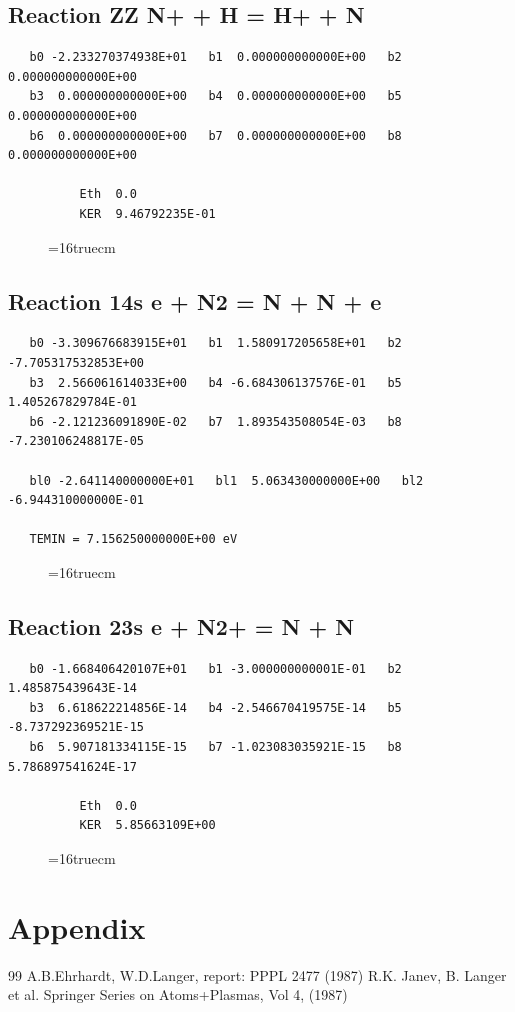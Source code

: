 \documentclass[12pt,dvipdfm]{article}
\begin{document}
\subsection{
Reaction ZZ N+ + H = H+ + N }
\begin{small}\begin{verbatim}
   b0 -2.233270374938E+01   b1  0.000000000000E+00   b2  0.000000000000E+00
   b3  0.000000000000E+00   b4  0.000000000000E+00   b5  0.000000000000E+00
   b6  0.000000000000E+00   b7  0.000000000000E+00   b8  0.000000000000E+00

          Eth  0.0
          KER  9.46792235E-01
\end{verbatim}\end{small}
\begin{figure}[h!] \label{n2rates}
\epsfxsize=16truecm
\end{figure}
\newpage

\subsection{
Reaction 14s e + N2 = N + N + e }
\begin{small}\begin{verbatim}
   b0 -3.309676683915E+01   b1  1.580917205658E+01   b2 -7.705317532853E+00
   b3  2.566061614033E+00   b4 -6.684306137576E-01   b5  1.405267829784E-01
   b6 -2.121236091890E-02   b7  1.893543508054E-03   b8 -7.230106248817E-05

   bl0 -2.641140000000E+01   bl1  5.063430000000E+00   bl2 -6.944310000000E-01

   TEMIN = 7.156250000000E+00 eV
\end{verbatim}\end{small}
\begin{figure}[h!] \label{n2rates}
\epsfxsize=16truecm
\end{figure}
\newpage

\subsection{
Reaction 23s e + N2+ = N + N }
\begin{small}\begin{verbatim}
   b0 -1.668406420107E+01   b1 -3.000000000001E-01   b2  1.485875439643E-14
   b3  6.618622214856E-14   b4 -2.546670419575E-14   b5 -8.737292369521E-15
   b6  5.907181334115E-15   b7 -1.023083035921E-15   b8  5.786897541624E-17

          Eth  0.0
          KER  5.85663109E+00

\end{verbatim}\end{small}
\begin{figure}[h!] \label{n2rates}
\epsfxsize=16truecm
\end{figure}
\newpage


\section{Appendix}
\newpage
\begin{thebibliography}{99}
  A.B.Ehrhardt, W.D.Langer, report: PPPL 2477
                       (1987)
 R.K. Janev, B. Langer et al.  Springer Series on Atoms+Plasmas,
                   Vol 4, (1987)
\end{thebibliography}
\end{document}

